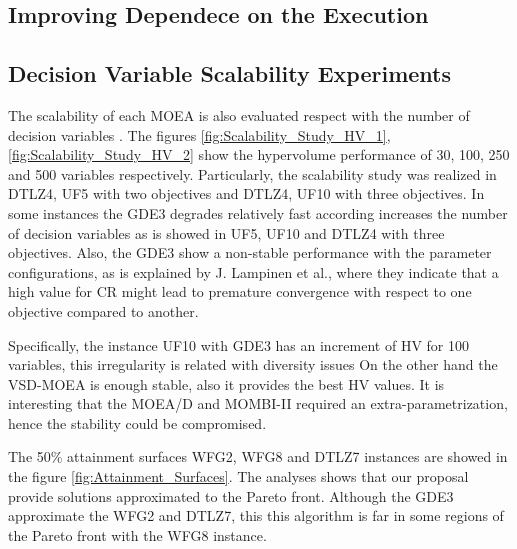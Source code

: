 \subsection{Improving Dependece on the Execution}

\subsection{Decision Variable Scalability Experiments}

The scalability of each MOEA is also evaluated respect with the number of decision variables \cite{Joel:ScalabilityStudy}. 
%
The figures \ref{fig:Scalability_Study_HV_1}, \ref{fig:Scalability_Study_HV_2} show the hypervolume performance of 30, 100, 250 and 500 variables respectively.
%
Particularly,  the scalability study was realized in DTLZ4, UF5 with two objectives and DTLZ4, UF10 with three objectives.
%
In some instances the GDE3 degrades relatively fast according increases the number of decision variables as is showed in UF5, UF10 and DTLZ4 with three objectives.
%
Also, the GDE3 show a non-stable performance with the parameter configurations, as is explained by J. Lampinen et al.\cite{Joel:GDE3_CEC09}, where they indicate that a high value for CR might lead to premature convergence with respect to one objective compared to another.

%
Specifically, the instance UF10 with GDE3 has an increment of HV for 100 variables, this irregularity is related with diversity issues \cite{Joel:GDE3_CEC09}
%
On the other hand the VSD-MOEA is enough stable, also it provides the best HV values.
%
It is interesting that the MOEA/D and MOMBI-II required an extra-parametrization, hence the stability could be compromised.

%
The 50\% attainment surfaces WFG2, WFG8 and DTLZ7 instances are showed in the figure \ref{fig:Attainment_Surfaces}.
%
The analyses shows that our proposal provide solutions approximated to the Pareto front.
%
Although the GDE3 approximate the WFG2 and DTLZ7, this this algorithm is far in some regions of the Pareto front with the WFG8 instance. 

